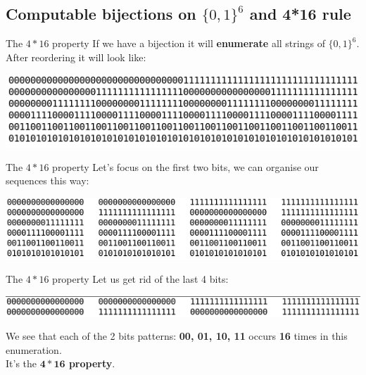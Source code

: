 \documentclass{beamer}
\begin{document}
\subsection{Computable bijections on $\{0,1\}^6$ and 4*16 rule}

\begin{frame}{The $4*16$ property} 
	If we have a bijection it will \textbf{enumerate} all strings of  
	$\{0,1\}^6$. After reordering it will look like:
	\medskip
	
	\includegraphics[scale=0.6]{all6b.png}
\end{frame}

\begin{frame}{The $4*16$ property} 
	Let's focus on the first two bits, we can organise our sequences this way:
	\medskip
	
	\includegraphics[scale=0.55]{all6b2b.png}
\end{frame}

\begin{frame}{The $4*16$ property} 
	Let us get rid of the last 4 bits:
	\medskip
	
	\includegraphics[scale=0.45]{6b2b.png}
	\medskip\pause
	
	We see that each of the 2 bits patterns:  \textbf{00, 01, 10, 11} occurs \textbf{16} times in this enumeration.\\
	It's the \textbf{$\boldsymbol{4*16}$ property}.
\end{frame}
\end{document}
